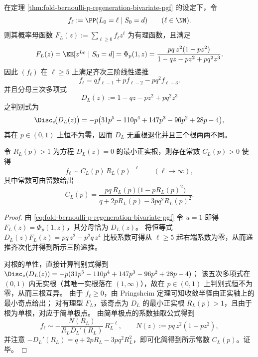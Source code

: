 \begin{theorem}\label{thm:fold-bernoulli-p-regeneration-length-pgf-recurrence-tail}
在定理 \ref{thm:fold-bernoulli-p-regeneration-bivariate-pgf} 的设定下，令
\[
f_\ell:=\PP(L_0=\ell\mid S_0=d)\qquad(\ell\in\NN).
\]
则其概率母函数 \(F_L(z):=\sum_{\ell\ge 0} f_\ell z^\ell\) 为有理函数，且满足
\[
F_L(z)=\EE[z^{L_0}\mid S_0=d]
=\Phi_p(1,z)
=\frac{p q\,z^2(1-p z^2)}{1-qz-pz^2+p q^2 z^3}.
\]
因此 \((f_\ell)\) 在 \(\ell\ge 5\) 上满足齐次三阶线性递推
\[
f_\ell=q f_{\ell-1}+p f_{\ell-2}-p q^2 f_{\ell-3}.
\]
并且分母三次多项式
\[
D_L(z):=1-qz-pz^2+p q^2 z^3
\]
之判别式为
\[
\Disc_z\!\bigl(D_L(z)\bigr)
=-p\bigl(31p^5-110p^4+147p^3-96p^2+28p-4\bigr),
\]
其在 \(p\in(0,1)\) 上恒不为零，因而 \(D_L\) 无重根退化并且三个根两两不同。

令 \(R_L(p)>1\) 为方程 \(D_L(z)=0\) 的最小正实根，则存在常数 \(C_L(p)>0\) 使得
\[
f_\ell\sim C_L(p)\,R_L(p)^{-\ell}\qquad(\ell\to\infty),
\]
其中常数可由留数给出
\[
C_L(p)=\frac{p q\,R_L(p)\bigl(1-p R_L(p)^2\bigr)}{q+2pR_L(p)-3p q^2 R_L(p)^2}.
\]
\end{theorem}
\begin{proof}
由 \eqref{eq:fold-bernoulli-p-regeneration-bivariate-pgf} 令 \(u=1\) 即得
\(
F_L(z)=\Phi_p(1,z)
\)，其分母恰为 \(D_L(z)\)。
将恒等式 \(D_L(z)F_L(z)=p q\,z^2-p^2 q\,z^4\) 比较系数可得从 \(\ell\ge 5\) 起右端系数为零，从而递推齐次化并得到所示三阶递推。

对根的单性，直接计算判别式得到
\(
\Disc_z(D_L(z))=-p(31p^5-110p^4+147p^3-96p^2+28p-4)
\)；
该五次多项式在 \((0,1)\) 内无实根（其唯一实根落在 \((1,\infty)\)），故在 \(p\in(0,1)\) 上判别式恒不为零，从而三根互异。
由于 \(f_\ell\ge 0\)，由 Pringsheim 定理可知收敛半径由正实轴上的最小奇点给出；
对有理型 \(F_L\)，该奇点为 \(D_L\) 的最小正实根 \(R_L(p)>1\)，且由于根为单根，对应于简单极点。
由简单极点的系数抽取公式得到
\[
f_\ell\sim -\frac{N(R_L)}{R_L D_L'(R_L)}\,R_L^{-\ell},
\qquad
N(z):=p q\,z^2(1-pz^2),
\]
并注意
\(
-D_L'(R_L)=q+2pR_L-3p q^2 R_L^2
\)，即可化简得到所示常数 \(C_L(p)\)。证毕。
\end{proof}

\endinput
